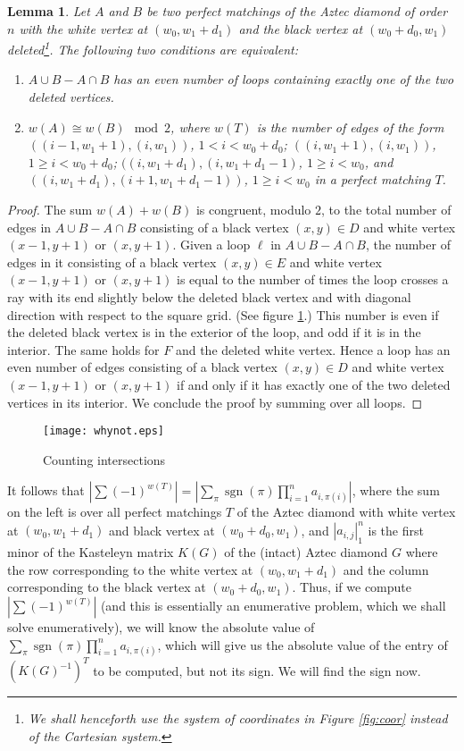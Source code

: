 \documentclass[10pt,reqno]{amsart}
\theoremstyle{plain}
\newtheorem{Lem}[Thm]{Lemma}
\theoremstyle{definition}
\theoremstyle{remark}
\def\determinant#1{\left|#1\right|}
\DeclareMathOperator{\sgn }{sgn }
\begin{document}
\begin{Lem}\label{Lem:opposum}
Let $A$ and $B$ be two perfect matchings of the Aztec diamond of 
order $n$ with the white vertex at $(w_0,w_1+d_1)$ and the black
vertex at $(w_0+d_0,w_1)$ deleted\footnote{We shall henceforth use
the system of coordinates in Figure
\ref{fig:coor} instead of the Cartesian system.}.
The following two conditions are equivalent:
\begin{enumerate}
\item $A\cup B - A\cap B$ has an even number of loops
containing exactly one of the two deleted vertices.
\item $w(A) \cong w(B) \mod 2$, where 
$w(T)$ is the number of edges of the form $((i-1,w_1+1),(i,w_1))$,
$1<i<w_0+d_0$; $((i,w_1+1),(i,w_1))$, $1\geq i<w_0+d_0$;
$((i,w_1+d_1),(i,w_1+d_1-1)$, $1\geq i<w_0$, and
$((i,w_1+d_1),(i+1,w_1+d_1-1))$, $1\geq i<w_0$ in a perfect matching $T$.
\end{enumerate}
\end{Lem}
\begin{proof}
The sum $w(A) + w(B)$ is congruent, modulo $2$, to
the total number of edges in $A\cup B - A\cap B$ consisting 
of a black vertex $(x,y)\in D$
and white vertex $(x-1,y+1)$ or $(x,y+1)$. Given a loop $\ell $
in $A\cup B - A\cap B$, the number of edges in it consisting
of a black vertex $(x,y)\in E$
and white vertex $(x-1,y+1)$ or $(x,y+1)$ is equal to the number
of times the loop crosses a ray with its end slightly below
the deleted black vertex and with diagonal direction with respect
to the square grid. (See figure \ref{fig:whynot}.)
 This number is even if  the deleted
black vertex is in the exterior of the loop, and odd if it is in the interior.
The same holds for $F$ and the deleted white vertex. Hence
a loop has an even number of edges consisting of a black vertex $(x,y)\in D$
and white vertex $(x-1,y+1)$ or $(x,y+1)$ if and only if it has exactly
one of the two deleted vertices in its interior. We conclude the proof
by summing over all loops.
\end{proof}

\begin{figure}
\centering
	\texttt{[image: whynot.eps]}
	\caption{Counting intersections}\label{fig:whynot}
\end{figure}

It follows that $|\sum (-1)^{w(T)}| = 
|\sum_{\pi } \sgn(\pi ) \prod_{i=1}^n a_{i,\pi(i)} |$, where
the sum on the left is over all perfect matchings $T$ of the Aztec
diamond with white vertex at $(w_0,w_1+d_1)$ and black
vertex at $(w_0+d_0,w_1)$, and $\determinant{a_{i,j}}_1^n$ is the
first minor of the Kasteleyn matrix $K(G)$ of the (intact) Aztec diamond $G$
where the row corresponding to the white vertex at $(w_0,w_1+d_1)$
and the column corresponding to the black vertex at $(w_0+d_0,w_1)$.
Thus, if we compute $|\sum (-1)^{w(T)}|$ (and this is essentially
an enumerative problem, which we shall solve enumeratively), we will
know the absolute value of 
$\sum_{\pi } \sgn(\pi ) \prod_{i=1}^n a_{i,\pi(i)}$, which
will give us the absolute value of the entry of $(K(G)^{-1})^T$ to
be computed, but not its sign. We will find the sign now.
\end{document}
